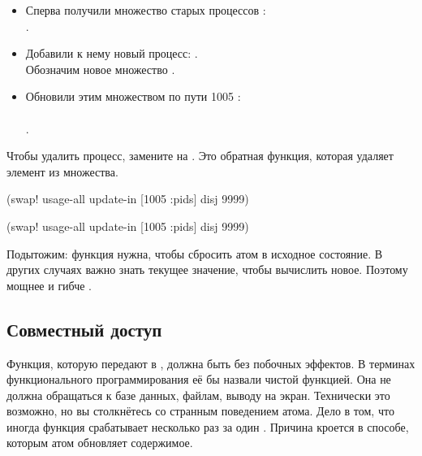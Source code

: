 \begin{itemize}

\item
  Сперва получили множество старых процессов :\\
  .

\item
  Добавили к нему новый процесс: .\ifnarrow\else\\\fi
  Обозначим новое множество .

\item
  Обновили  этим множеством по пути 1005 \arr{} :\\
  \ifnarrow
   \\
  \else
  .
  \fi

\end{itemize}

Чтобы удалить процесс, замените  на . Это обратная
функция, которая удаляет элемент из множества.


\ifnarrow

\begin{clojure}
(swap! usage-all
  update-in [1005 :pids] disj 9999)
\end{clojure}

\else

\begin{clojure}
(swap! usage-all update-in [1005 :pids] disj 9999)
\end{clojure}

\fi

Подытожим: функция  нужна, чтобы сбросить атом в исходное
состояние. В других случаях важно знать текущее значение, чтобы вычислить
новое. Поэтому  мощнее и гибче .

\subsection{Совместный доступ}


Функция, которую передают в , должна быть без побочных эффектов. В
терминах функционального программирования её бы назвали чистой функцией. Она не
должна обращаться к базе данных, файлам, выводу на экран. Технически это
возможно, но вы столкнётесь со странным поведением атома. Дело в том, что иногда
функция срабатывает несколько раз за один . Причина кроется в
способе, которым атом обновляет содержимое.

